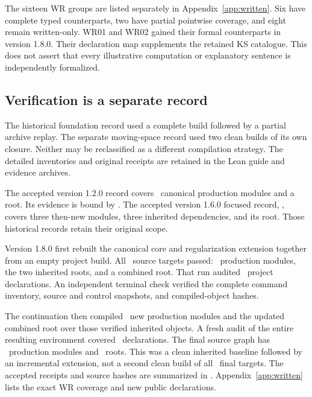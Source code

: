 The sixteen WR groups are listed separately in Appendix~\ref{app:written}. Six have complete typed counterparts, two have partial pointwise coverage, and eight remain written-only. WR01 and WR02 gained their formal counterparts in version 1.8.0. Their declaration map supplements the retained KS catalogue. This does not assert that every illustrative computation or explanatory sentence is independently formalized.



\subsection{Verification is a separate record}
The historical foundation record used a complete build followed by a partial archive replay. The separate moving-space record used two clean builds of its own closure. Neither may be reclassified as a different compilation strategy. The detailed inventories and original receipts are retained in the Lean guide and evidence archives.

The accepted version 1.2.0 record covers \EditionFormalModules\ canonical production modules and a root. Its evidence is bound by . The accepted version 1.6.0 focused record, , covers three then-new modules, three inherited dependencies, and its root. Those historical records retain their original scope.

Version 1.8.0 first rebuilt the canonical core and regularization extension together from an empty project build. All \EditionCumulativeBaseTargets\ source targets passed: \EditionCumulativeBaseModules\ production modules, the two inherited roots, and a combined root. That run audited \EditionCumulativeBaseDeclarations\ project declarations. An independent terminal check verified the complete command inventory, source and control snapshots, and compiled-object hashes.

The continuation then compiled \EditionContinuationModules\ new production modules and the updated combined root over those verified inherited objects. A fresh audit of the entire resulting environment covered \EditionCumulativeDeclarations\ declarations. The final source graph has \EditionCumulativeModules\ production modules and \EditionCumulativeRoots\ roots. This was a clean inherited baseline followed by an incremental extension, not a second clean build of all \EditionCumulativeTargets\ final targets. The accepted receipts and source hashes are summarized in . Appendix~\ref{app:written} lists the exact WR coverage and new public declarations.

